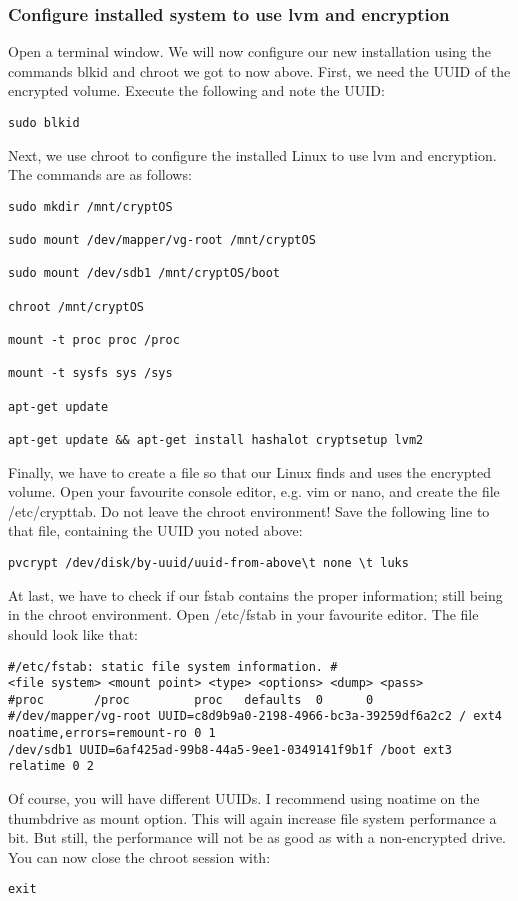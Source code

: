 \documentclass[12pt,a4paper]{article}
\begin{document}
\subsubsection{Configure installed system to use lvm and encryption}
Open a terminal window. We will now configure our new installation using the commands blkid and chroot we got to now above. First, we need the UUID of the encrypted volume. Execute the following and note the UUID:
\begin{Verbatim}[commandchars=\\\{\}]
sudo blkid
\end{Verbatim}
Next, we use chroot to configure the installed Linux to use lvm and encryption. The commands are as follows:
\begin{Verbatim}[commandchars=\\\{\}]
sudo mkdir /mnt/cryptOS

sudo mount /dev/mapper/vg-root /mnt/cryptOS

sudo mount /dev/sdb1 /mnt/cryptOS/boot

chroot /mnt/cryptOS

mount -t proc proc /proc

mount -t sysfs sys /sys

apt-get update

apt-get update && apt-get install hashalot cryptsetup lvm2
\end{Verbatim}
Finally, we have to create a file so that our Linux finds and uses the encrypted volume. Open your favourite console editor, e.g. vim or nano, and create the file /etc/crypttab. Do not leave the chroot environment! Save the following line to that file, containing the UUID you noted above:
\begin{Verbatim}[commandchars=\\\{\}]
pvcrypt /dev/disk/by-uuid/uuid-from-above\t none \t luks
\end{Verbatim}
At last, we have to check if our fstab contains the proper information; still being in the chroot environment. Open /etc/fstab in your favourite editor. The file should look like that:
\begin{Verbatim}[commandchars=\\\{\}]
#/etc/fstab: static file system information. #
<file system> <mount point> <type> <options> <dump> <pass>	
#proc		/proc	      proc   defaults  0      0		
#/dev/mapper/vg-root UUID=c8d9b9a0-2198-4966-bc3a-39259df6a2c2 / ext4 noatime,errors=remount-ro 0 1  
/dev/sdb1 UUID=6af425ad-99b8-44a5-9ee1-0349141f9b1f /boot ext3  relatime 0 2
\end{Verbatim}
Of course, you will have different UUIDs. I recommend using noatime on the thumbdrive as mount option. This will again increase file system performance a bit. But still, the performance will not be as good as with a non-encrypted drive. You can now close the chroot session with:
\begin{Verbatim}[commandchars=\\\{\}]
exit
\end{Verbatim}
\end{document}
